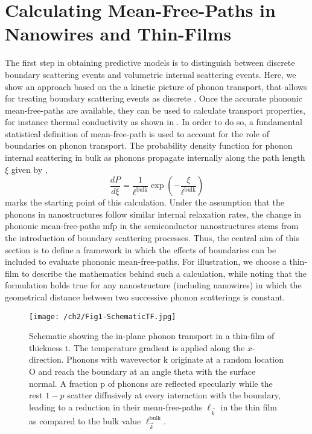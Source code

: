 \section{Calculating Mean-Free-Paths in Nanowires and Thin-Films}\label{sec:MFPRedModel}
The first step in obtaining predictive models is to distinguish between discrete boundary scattering events and volumetric internal scattering events. Here, we show an approach based on the a kinetic picture of phonon transport, that allows for treating boundary scattering events as discrete \cite{maldovan2011tf,RN115}. Once the accurate phononic mean-free-paths are available, they can be used to calculate transport properties, for instance thermal conductivity as shown in . In order to do so, a fundamental statistical definition of mean-free-path is used to account for the role of boundaries on phonon transport. The probability density function for phonon internal scattering in bulk as phonons propagate internally along the path length $\xi$ given by \cite{RN221},
\begin{equation}
\dfrac{dP}{d\xi}= \dfrac{1}{\ell^{\text{bulk}}}\exp(-\dfrac{\xi}{\ell^{\text{bulk}}})
\label{eq:ch2-prob}
\end{equation}
marks the starting point of this calculation. Under the assumption that the phonons in nanostructures follow similar internal relaxation rates, the change in phononic mean-free-paths \gls{mfp} in the semiconductor nanostructures stems from the introduction of boundary scattering processes. Thus, the central aim of this section is to define a framework in which the effects of boundaries can be included to evaluate phononic mean-free-paths. For illustration, we choose a thin-film to describe the mathematics behind such a calculation, while noting that the formulation holds true for any nanostructure (including nanowires) in which the geometrical distance between two successive phonon scatterings is constant. 
\begin{figure}[hbt]
	\centering \texttt{[image: /ch2/Fig1-SchematicTF.jpg]}
	\caption{Schematic showing the in-plane phonon transport in a thin-film of thickness \gls{t}. The temperature gradient is applied along the $x$-direction. Phonons with wavevector \gls{k} originate at a random location O and reach the boundary at an angle \gls{theta} with the surface normal. A fraction \gls{p} of phonons are reflected specularly while the rest $1-p$ scatter diffusively at every interaction with the boundary, leading to a reduction in their mean-free-paths $\ell_{\vec{k}}$ in the thin film as compared to the bulk value $\ell^{\text{bulk}}_{\vec{k}}$.}
	\label{fig:ch2-tf_scatter_schematic}
\end{figure}
